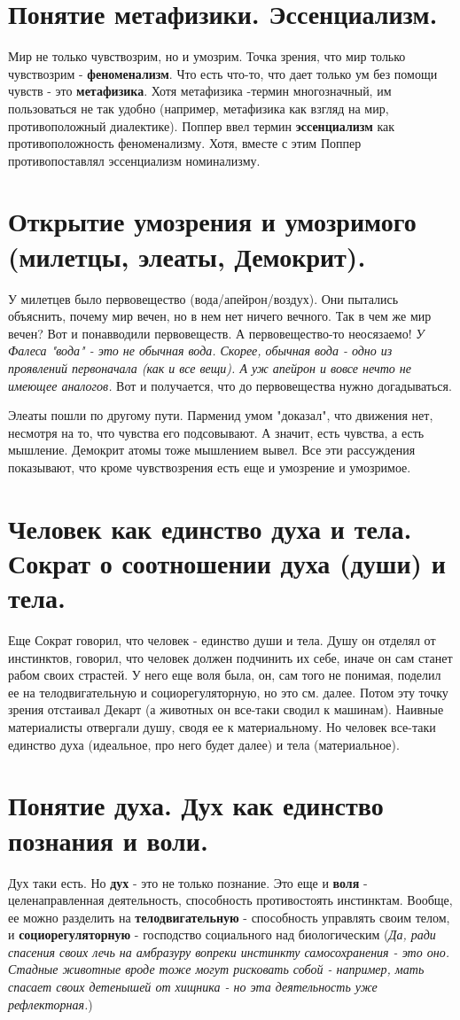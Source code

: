 \section{ Понятие метафизики. Эссенциализм.}
Мир не только чувствозрим, но и умозрим. Точка зрения, что мир только чувствозрим - \textbf{феноменализм}. Что есть что-то, что дает только ум без помощи чувств - это \textbf{метафизика}. Хотя метафизика -термин многозначный, им пользоваться не так удобно (например, метафизика как взгляд на мир, противоположный диалектике). Поппер ввел термин \textbf{эссенциализм} как противоположность феноменализму. Хотя, вместе с этим Поппер противопоставлял эссенциализм номинализму.

\section{ Открытие умозрения и умозримого (милетцы, элеаты, Демокрит).}
У милетцев было первовещество (вода/апейрон/воздух). Они пытались объяснить, почему мир вечен, но в нем нет ничего вечного. Так в чем же мир вечен? Вот и понавводили первовеществ. А первовещество-то неосязаемо! \textit{У Фалеса "вода" - это не обычная вода. Скорее, обычная вода - одно из проявлений первоначала (как и все вещи). А уж апейрон и вовсе нечто не имеющее аналогов.} Вот и получается, что до первовещества нужно догадываться.

Элеаты пошли по другому пути. Парменид умом "доказал", что движения нет, несмотря на то, что чувства его подсовывают. А значит, есть чувства, а есть мышление. Демокрит атомы тоже мышлением вывел. Все эти рассуждения показывают, что кроме чувствозрения есть еще и умозрение и умозримое.

\section{ Человек как единство духа и тела. Сократ о соотношении духа (души) и тела.}
Еще Сократ говорил, что человек - единство души и тела. Душу он отделял от инстинктов, говорил, что человек должен подчинить их себе, иначе он сам станет рабом своих страстей. У него еще воля была, он, сам того не понимая, поделил ее на телодвигательную и социорегуляторную, но это см. далее. Потом эту точку зрения отстаивал Декарт (а животных он все-таки сводил к машинам). Наивные материалисты отвергали душу, сводя ее к материальному. Но человек все-таки единство духа (идеальное, про него будет далее) и тела (материальное). 

\section{ Понятие духа. Дух как единство познания и воли.}
Дух таки есть. Но \textbf{дух} - это не только познание. Это еще и \textbf{воля} - целенаправленная деятельность, способность противостоять инстинктам. Вообще, ее можно разделить на \textbf{телодвигательную} - способность управлять своим телом, и \textbf{социорегуляторную} - господство социального над биологическим (\textit{Да, ради спасения своих лечь на амбразуру вопреки инстинкту самосохранения - это оно. Стадные животные вроде тоже могут рисковать собой - например, мать спасает своих детенышей от хищника - но эта деятельность уже рефлекторная.})

